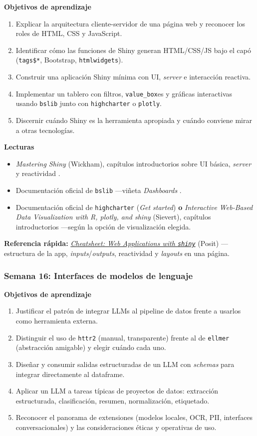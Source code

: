 \documentclass[11pt,letterpaper]{article}
\newcommand{\semana}[2]{%
  \subsubsection*{\color{main}Semana #1: #2}%
}
\newcommand{\cheatsheet}[2]{%
  \href{https://rstudio.github.io/cheatsheets/#1.pdf}{\textit{Cheatsheet: #2}}%
}
\begin{document}
\medskip
\noindent\textbf{Objetivos de aprendizaje}
\begin{enumerate}[leftmargin=*, itemsep=1pt]
    \item Explicar la arquitectura cliente-servidor de una página web y reconocer los roles de HTML, CSS y JavaScript.
    \item Identificar cómo las funciones de Shiny generan HTML/CSS/JS bajo el capó (\texttt{tags\$*}, Bootstrap, \texttt{htmlwidgets}).
    \item Construir una aplicación Shiny mínima con UI, \textit{server} e interacción reactiva.
    \item Implementar un tablero con filtros, \texttt{value\_box}es y gráficas interactivas usando \texttt{bslib} junto con \texttt{highcharter} o \texttt{plotly}.
    \item Discernir cuándo Shiny es la herramienta apropiada y cuándo conviene mirar a otras tecnologías.
\end{enumerate}

\medskip
\noindent\textbf{Lecturas}
\begin{itemize}[leftmargin=*, itemsep=1pt]
    \item \textit{Mastering Shiny} (Wickham), capítulos introductorios sobre UI básica, \textit{server} y reactividad \cite{wickham2021mastering-shiny}.
    \item Documentación oficial de \texttt{bslib} ---viñeta \textit{Dashboards} \cite{bslib-docs}.
    \item Documentación oficial de \texttt{highcharter} (\textit{Get started}) \cite{kunst-highcharter} \textbf{o} \textit{Interactive Web-Based Data Visualization with R, plotly, and shiny} (Sievert), capítulos introductorios \cite{sievert-plotly} ---según la opción de visualización elegida.
\end{itemize}

\medskip
\noindent\textbf{Referencia rápida:} \cheatsheet{shiny}{Web Applications with \texttt{shiny}} (Posit) ---estructura de la app, \textit{inputs}/\textit{outputs}, reactividad y \textit{layouts} en una página.

\semana{16}{Interfaces de modelos de lenguaje}

\medskip
\noindent\textbf{Objetivos de aprendizaje}
\begin{enumerate}[leftmargin=*, itemsep=1pt]
    \item Justificar el patrón de integrar LLMs al pipeline de datos frente a usarlos como herramienta externa.
    \item Distinguir el uso de \texttt{httr2} (manual, transparente) frente al de \texttt{ellmer} (abstracción amigable) y elegir cuándo cada uno.
    \item Diseñar y consumir salidas estructuradas de un LLM con \textit{schemas} para integrar directamente al dataframe.
    \item Aplicar un LLM a tareas típicas de proyectos de datos: extracción estructurada, clasificación, resumen, normalización, etiquetado.
    \item Reconocer el panorama de extensiones (modelos locales, OCR, PII, interfaces conversacionales) y las consideraciones éticas y operativas de uso.
\end{enumerate}
\end{document}
